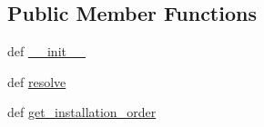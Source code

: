 \subsection*{Public Member Functions}
\begin{DoxyCompactItemize}
\item 
def \hyperlink{classpip_1_1__internal_1_1resolution_1_1resolvelib_1_1resolver_1_1Resolver_a9d93d170d76b9f902589afa587848c6c}{\+\_\+\+\_\+init\+\_\+\+\_\+}
\item 
def \hyperlink{classpip_1_1__internal_1_1resolution_1_1resolvelib_1_1resolver_1_1Resolver_a5c27ce2d421d106687419139b8ffb1e8}{resolve}
\item 
def \hyperlink{classpip_1_1__internal_1_1resolution_1_1resolvelib_1_1resolver_1_1Resolver_a303facb43c40a63aa661572e98976715}{get\+\_\+installation\+\_\+order}
\end{DoxyCompactItemize}
